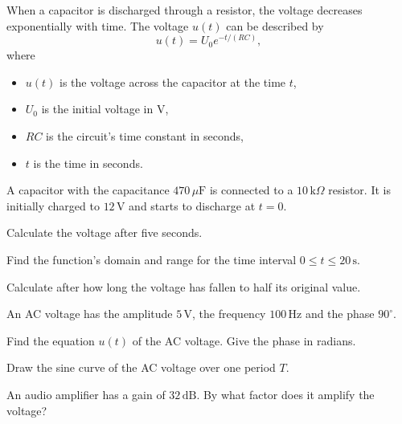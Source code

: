 When a capacitor is discharged through a resistor, the voltage decreases exponentially with time.
The voltage $u(t)$ can be described by
\[
  u(t) = U_0 e^{-t/(RC)},
\]
where
\begin{itemize}
  \item $u(t)$ is the voltage across the capacitor at the time $t$,
  \item $U_0$ is the initial voltage in V,
  \item $RC$ is the circuit's time constant in seconds,
  \item $t$ is the time in seconds.
\end{itemize}
A capacitor with the capacitance $470\,\mu\text{F}$ is connected to a $10\,\text{k}\Omega$
resistor. It is initially charged to $12\,\text{V}$ and starts to discharge at $t = 0$.
\begin{parts}
  \item Calculate the voltage after five seconds.
  \item Find the function's domain and range for the time interval
    $0 \leq t \leq 20\,\text{s}$.
  \item Calculate after how long the voltage has fallen to half its original value.
\end{parts}

An AC voltage has the amplitude $5\,\text{V}$, the frequency $100\,\text{Hz}$ and the phase
$90^{\circ}$.
\begin{parts}
  \item Find the equation $u(t)$ of the AC voltage. Give the phase in radians.
  \item Draw the sine curve of the AC voltage over one period $T$.
\end{parts}

An audio amplifier has a gain of $32\,\text{dB}$. By what factor does it amplify the voltage?
